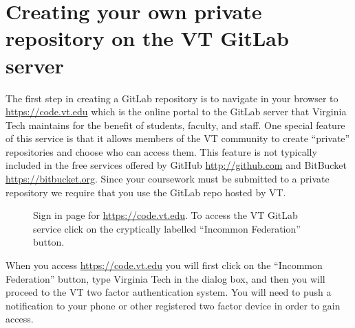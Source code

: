 \section{Creating your own private repository on the VT GitLab server}


The first step in creating a GitLab repository is to navigate in your browser to \href{https://code.vt.edu}{https://code.vt.edu} which is the online portal to the GitLab server that Virginia Tech maintains for the benefit of students, faculty, and staff. One special feature of this service is that it allows members of the VT community to create ``private'' repositories and choose who can access them. This feature is not typically included in the free services offered by GitHub \href{https://github.com/}{http://github.com} and BitBucket \href{https://bitbucket.org}{https://bitbucket.org}. Since your coursework must be submitted to a private repository we require that you use the GitLab repo hosted by VT. 

\begin{figure}[htbp!]
    \centering
    \caption{Sign in page for \href{https://code.vt.edu}{https://code.vt.edu}. To access the VT GitLab service click on the cryptically labelled ``Incommon Federation'' button.}
    \label{signInCodeVtEdu.fig}
\end{figure}

When you access \href{https://code.vt.edu}{https://code.vt.edu} you will first click on the ``Incommon Federation'' button, type Virginia Tech in the dialog box, and then you will proceed to the VT two factor authentication system.  You will need to push a notification to your phone or other registered two factor device in order to gain access.


